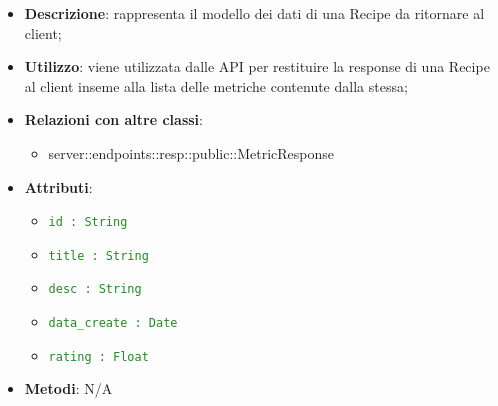     \begin{itemize}
      \item \textbf{Descrizione}: rappresenta il modello dei dati di una Recipe da ritornare al client;
      \item \textbf{Utilizzo}: viene utilizzata dalle API per restituire la response di una Recipe al client inseme alla lista delle metriche contenute dalla stessa;
      \item \textbf{Relazioni con altre classi}:
        \begin{itemize}
        \item server::endpoints::resp::public::MetricResponse
    \end{itemize}
    \item \textbf{Attributi}:
      \begin{itemize}
        \item \textcolor{forestgreen}{\texttt{id : String}}
        \item \textcolor{forestgreen}{\texttt{title : String}}
        \item \textcolor{forestgreen}{\texttt{desc : String}}
        \item \textcolor{forestgreen}{\texttt{data\_create : Date}}
        \item \textcolor{forestgreen}{\texttt{rating : Float}}
      \end{itemize}
    \item \textbf{Metodi}: N/A
      \end{itemize}

